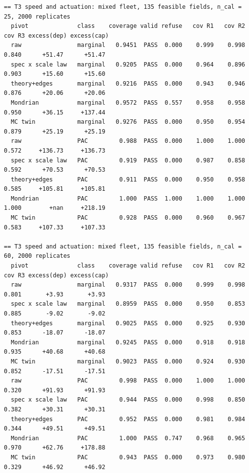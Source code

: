 \documentclass[preprint,12pt,authoryear]{elsarticle}
\begin{document}
\begin{Verbatim}[fontsize=\tiny,breaklines]
== T3 speed and actuation: mixed fleet, 135 feasible fields, n_cal = 25, 2000 replicates
  pivot              class    coverage valid refuse   cov R1   cov R2   cov R3 excess(dep) excess(cap)
  raw                marginal   0.9451  PASS  0.000    0.999    0.998    0.840      +51.47      +51.47
  spec x scale law   marginal   0.9205  PASS  0.000    0.964    0.896    0.903      +15.60      +15.60
  theory+edges       marginal   0.9216  PASS  0.000    0.943    0.946    0.876      +20.06      +20.06
  Mondrian           marginal   0.9572  PASS  0.557    0.958    0.958    0.950      +36.15     +137.44
  MC twin            marginal   0.9276  PASS  0.000    0.950    0.954    0.879      +25.19      +25.19
  raw                PAC         0.988  PASS  0.000    1.000    1.000    0.572     +136.73     +136.73
  spec x scale law   PAC         0.919  PASS  0.000    0.987    0.858    0.592      +70.53      +70.53
  theory+edges       PAC         0.911  PASS  0.000    0.950    0.958    0.585     +105.81     +105.81
  Mondrian           PAC         1.000  PASS  1.000    1.000    1.000    1.000        +nan     +218.19
  MC twin            PAC         0.928  PASS  0.000    0.960    0.967    0.583     +107.33     +107.33

== T3 speed and actuation: mixed fleet, 135 feasible fields, n_cal = 60, 2000 replicates
  pivot              class    coverage valid refuse   cov R1   cov R2   cov R3 excess(dep) excess(cap)
  raw                marginal   0.9317  PASS  0.000    0.999    0.998    0.801       +3.93       +3.93
  spec x scale law   marginal   0.8959  PASS  0.000    0.950    0.853    0.885       -9.02       -9.02
  theory+edges       marginal   0.9025  PASS  0.000    0.925    0.930    0.853      -18.07      -18.07
  Mondrian           marginal   0.9245  PASS  0.000    0.918    0.918    0.935      +40.68      +40.68
  MC twin            marginal   0.9023  PASS  0.000    0.924    0.930    0.852      -17.51      -17.51
  raw                PAC         0.998  PASS  0.000    1.000    1.000    0.320      +91.93      +91.93
  spec x scale law   PAC         0.944  PASS  0.000    0.998    0.850    0.382      +30.31      +30.31
  theory+edges       PAC         0.952  PASS  0.000    0.981    0.984    0.344      +49.51      +49.51
  Mondrian           PAC         1.000  PASS  0.747    0.968    0.965    0.970      +62.76     +178.88
  MC twin            PAC         0.943  PASS  0.000    0.973    0.980    0.329      +46.92      +46.92


\end{Verbatim}
\end{document}

